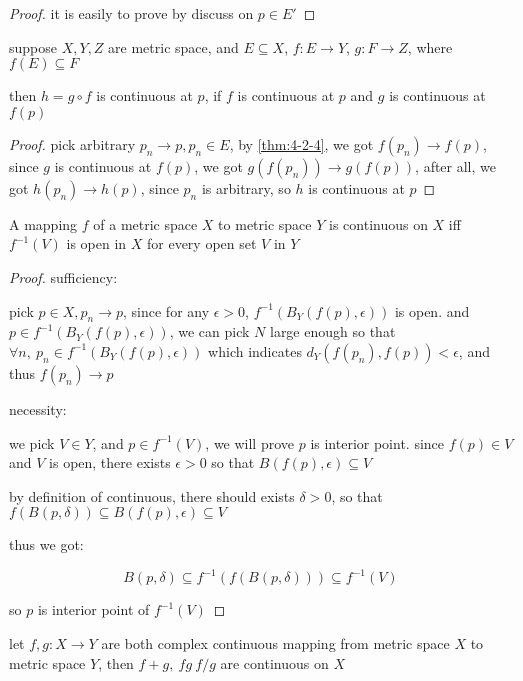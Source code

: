 \begin{proof}
    it is easily to prove by discuss on $p \in E'$
\end{proof}

\begin{thm}
    suppose $X, Y,Z$ are metric space, and $E \subseteq X$, $f: E \to Y$, $g: F \to Z$, where $f(E) \subseteq F$

    then $h =  g \circ f$ is continuous at $p$, if $f$ is continuous at $p$ and $g$ is continuous at $f(p)$
\end{thm}

\begin{proof}
    pick arbitrary $p_n \to p,  p_n \in E$, by \autoref{thm:4-2-4}, we got $f(p_n) \to f(p)$,
    since $g$ is continuous at $f(p)$, we got $g(f(p_n)) \to g(f(p))$, after all, we got
    $h(p_n) \to h(p)$, since $p_n$ is arbitrary, so $h$ is continuous at $p$
\end{proof}

\begin{thm}
    A mapping $f$ of a metric space $X$ to metric space $Y$ is continuous on $X$
    iff $f^{-1}(V)$ is open in $X$ for every open set $V$ in $Y$
\end{thm}

\begin{proof}
    sufficiency:

    pick $p \in X, p_n \to p$, since for any $\epsilon > 0$, $f^{-1}(B_Y(f(p), \epsilon))$ is open.
    and $p \in f^{-1}(B_Y(f(p), \epsilon))$, we can pick $N$ large enough so that $\forall n,\: p_n \in f^{-1}(B_Y(f(p), \epsilon))$
    which indicates $d_Y(f(p_n), f(p)) < \epsilon $, and thus $f(p_n) \to p$

    necessity:

    we pick $V \in Y$, and $p \in f^{-1}(V)$, we will prove $p$ is interior point.
    since $f(p) \in V$ and $V$ is open, there exists $\epsilon > 0$ so that $B(f(p), \epsilon) \subseteq V$

    by definition of continuous, there should exists $\delta > 0$, so that $f(B(p, \delta)) \subseteq B(f(p), \epsilon) \subseteq V$

    thus we got:

    \[
        B(p, \delta) \subseteq f^{-1}(f(B(p, \delta))) \subseteq f^{-1}(V)
    \]

    so $p$ is interior point of $f^{-1}(V)$
\end{proof}

\begin{thm}
    let $f,g: X \to Y$ are both complex continuous mapping from metric space $X$ to metric space $Y$,
    then $f+g, \: fg \: f/g$ are continuous on $X$
\end{thm}

